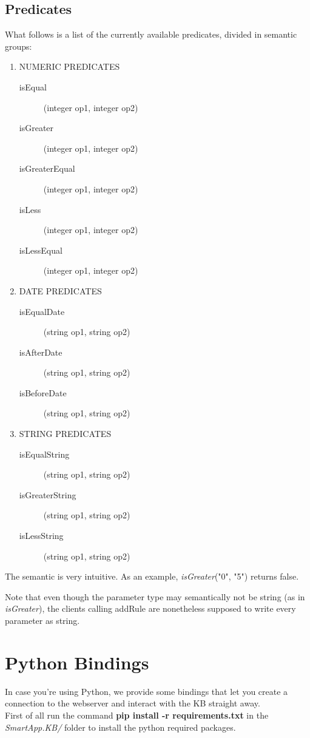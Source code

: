 \documentclass{article}
\begin{document}
\subsection{Predicates} \label{predicates}

What follows is a list of the currently available predicates, divided in semantic groups:
\begin{enumerate}
    \item NUMERIC PREDICATES
        \begin{description}
            \item[isEqual] (integer op1, integer op2)
            \item[isGreater] (integer op1, integer op2)
            \item[isGreaterEqual] (integer op1, integer op2)
            \item[isLess] (integer op1, integer op2)
            \item[isLessEqual] (integer op1, integer op2)
        \end{description}
    \item DATE PREDICATES
        \begin{description}
            \item[isEqualDate] (string op1, string op2)
            \item[isAfterDate] (string op1, string op2)
            \item[isBeforeDate] (string op1, string op2)
        \end{description}
    \item STRING PREDICATES
        \begin{description}
            \item[isEqualString] (string op1, string op2)
            \item[isGreaterString] (string op1, string op2)
            \item[isLessString] (string op1, string op2)
        \end{description}
\end{enumerate}

The semantic is very intuitive. As an example, \textit{isGreater}("0", "5") returns false.

Note that even though the parameter type may semantically not be string (as in \textit{isGreater}), the clients calling addRule are nonetheless supposed to write every parameter as string.
\section{Python Bindings}
In case you're using Python, we provide some bindings that let you create a connection to the webserver and interact with the KB straight away. \\
First of all run the command \textbf{pip install -r requirements.txt} in the \textit{SmartApp.KB/} folder to install the python required packages.
\end{document}
